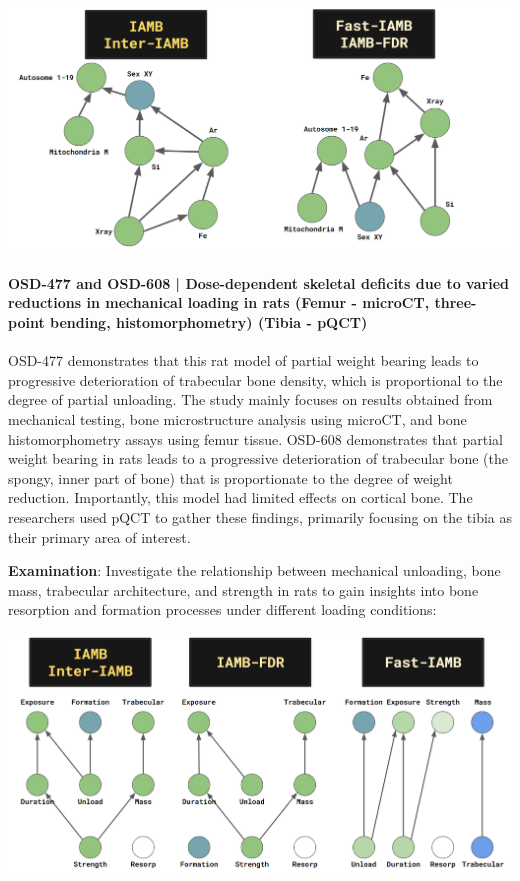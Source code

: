 \documentclass{article}
\begin{document}
\includegraphics[width=\textwidth,height=\textheight,keepaspectratio]{GLDS-366.png}


\paragraph{OSD-477 and OSD-608 | Dose-dependent skeletal deficits due to varied reductions in mechanical loading in rats (Femur - microCT, three-point bending, histomorphometry) (Tibia - pQCT)}
OSD-477 demonstrates that this rat model of partial weight bearing leads to progressive deterioration of trabecular bone density, which is proportional to the degree of partial unloading. The study mainly focuses on results obtained from mechanical testing, bone microstructure analysis using microCT, and bone histomorphometry assays using femur tissue.
OSD-608 demonstrates that partial weight bearing in rats leads to a progressive deterioration of trabecular bone (the spongy, inner part of bone) that is proportionate to the degree of weight reduction. Importantly, this model had limited effects on cortical bone. The researchers used pQCT to gather these findings, primarily focusing on the tibia as their primary area of interest.

\quad\quad\textbf{Examination}: Investigate the relationship between mechanical unloading, bone mass, trabecular architecture, and strength in rats to gain insights into bone resorption and formation processes under different loading conditions:

\includegraphics[width=\textwidth,height=\textheight,keepaspectratio]{OSD-477_OSD-608.png}
\end{document}
